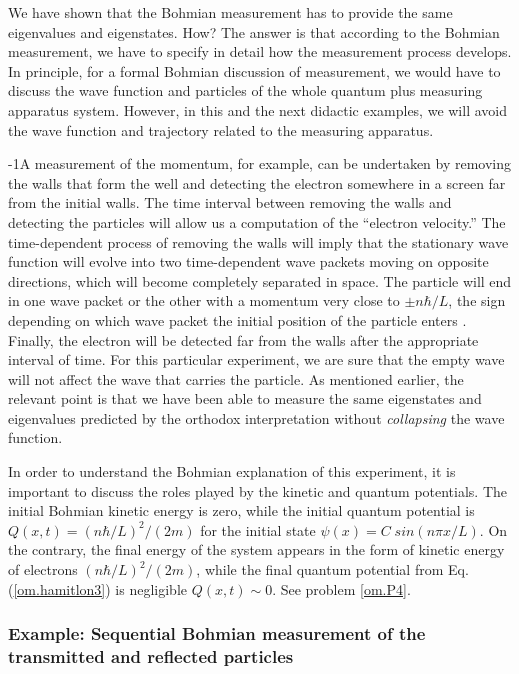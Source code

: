 \documentclass[onecolumn,nofootinbib, secnumarabic, amsmath, nobibnotes,12pt,aps,pra]{revtex4-1}
\newcommand{\eref}[1]{Eq. (\ref{#1})}
\begin{document}
We have shown that the Bohmian measurement has to provide the same
eigenvalues and eigenstates. How? The answer is that according to
the Bohmian measurement, we have to specify in detail how the
measurement process develops. In principle, for a formal Bohmian
discussion of measurement, we would have to discuss the wave
function and particles of the whole quantum plus measuring apparatus system. However, in this and the next didactic examples,
we will avoid the wave function and trajectory related to the
measuring apparatus.

\looseness-1A measurement of the momentum, for example, can be undertaken by
removing the walls that form the well and detecting the electron
somewhere in a screen far from the initial walls. The time interval
between removing the walls and detecting the particles will allow us
a computation of the ``electron velocity.'' The time-dependent
process of removing the walls will imply that the stationary wave
function will evolve into two time-dependent wave packets moving on
opposite directions, which will become completely separated in
space. The particle will end in one wave packet or the other with a
momentum very close to $\pm n \hbar/L$, the sign depending on which
wave packet the initial position of the particle enters
\cite{om.bohm1952b}. Finally, the electron will be detected far from
the walls after the appropriate interval of time. For this
particular experiment, we are sure that the empty wave will not
affect the wave that carries the particle. As mentioned earlier, the
relevant point is that we have been able to measure the same
eigenstates and eigenvalues predicted by the orthodox interpretation
without \textit{collapsing} the wave function.

In order to understand the Bohmian explanation of this experiment, it is important to discuss the roles played by the kinetic and quantum potentials. The initial Bohmian kinetic energy is zero, while the initial quantum potential is $Q(x,t) = (n\hbar/L)^{2}/(2m)$ for the initial state $\psi(x) = C \; sin(n \pi x/L)$. On the contrary, the final energy of the system appears in the form of kinetic energy of electrons $(n\hbar/L)^{2}/(2m)$, while the final quantum potential from \eref{om.hamitlon3} is negligible $Q(x,t)\sim 0$. See problem \ref{om.P4}.

\enlargethispage{13pt}
\subsubsection{Example: Sequential Bohmian measurement of the transmitted and reflected particles}
\label{om.measure_transmission}
\end{document}
